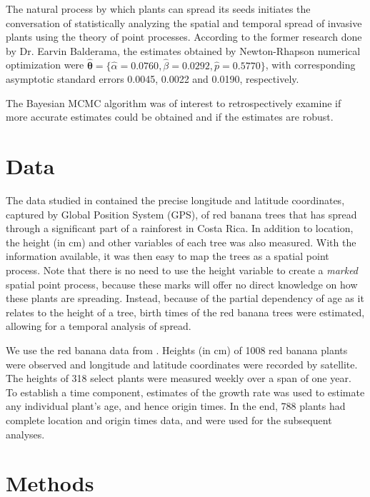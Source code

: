 \documentclass[11pt]{article}\usepackage[]{graphicx}\usepackage[]{color}
\begin{document}
{The natural process by which plants can spread its seeds initiates the conversation of statistically analyzing the spatial and temporal spread of invasive plants using the theory of point processes. According to the former research done by Dr. Earvin Balderama, the estimates obtained by Newton-Rhapson numerical optimization were $\boldsymbol{\hat\theta} = \{\hat\alpha = 0.0760, \hat\beta = 0.0292, \hat p = 0.5770\}$, with corresponding asymptotic standard errors 0.0045, 0.0022 and 0.0190, respectively. 

The Bayesian MCMC algorithm was of interest to retrospectively examine if more accurate estimates could be obtained and if the estimates are robust.
\section{Data}



The data studied in \cite{Balderama12} contained the precise longitude and latitude coordinates, captured by Global Position System (GPS), of red banana trees that has spread through a significant part of a rainforest in Costa Rica. In addition to location, the height (in cm) and other variables of each tree was also measured. With the information available, it was then easy to map the trees as a spatial point process. Note that there is no need to use the height variable to create a {\it marked} spatial point process, because these marks will offer no direct knowledge on how these plants are spreading. Instead, because of the partial dependency of age as it relates to the height of a tree, birth times of the red banana trees were estimated, allowing for a temporal analysis of spread.


We use the red banana data from \cite{Balderama12}. Heights (in cm) of 1008 red banana plants were observed and longitude and latitude coordinates were recorded by satellite. The heights of 318 select plants were measured weekly over a span of one year. To establish a time component, estimates of the growth rate was used to estimate any individual plant's age, and hence origin times. In the end, 788 plants had complete location and origin times data, and were used for the subsequent analyses.

\section{Methods}

}
\end{document}

